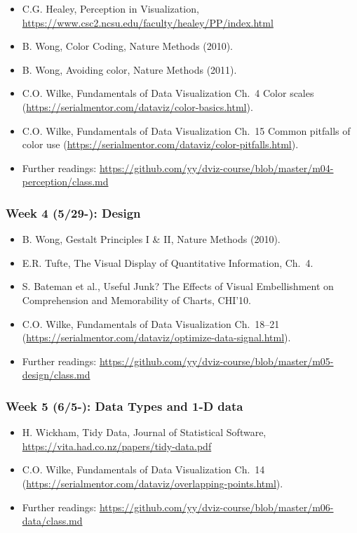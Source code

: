 \begin{itemize}\itemsep0em 
\item C.G. Healey, Perception in Visualization, \url{https://www.csc2.ncsu.edu/faculty/healey/PP/index.html}
\item B. Wong, Color Coding, Nature Methods (2010).
\item B. Wong, Avoiding color, Nature Methods (2011). 
\item C.O. Wilke, Fundamentals of Data Visualization Ch.~4 Color scales (\url{https://serialmentor.com/dataviz/color-basics.html}). 
\item C.O. Wilke, Fundamentals of Data Visualization Ch.~15 Common pitfalls of color use (\url{https://serialmentor.com/dataviz/color-pitfalls.html}).
\item Further readings: \url{https://github.com/yy/dviz-course/blob/master/m04-perception/class.md}
\end{itemize}	
\subsubsection{Week 4 (5/29-): Design }%

\begin{itemize}\itemsep0em 
\item B. Wong, Gestalt Principles I \& II, Nature Methods (2010). 
\item E.R. Tufte, The Visual Display of Quantitative Information, Ch.~4.
\item S. Bateman et al., Useful Junk? The Effects of Visual Embellishment on Comprehension and Memorability of Charts, CHI'10.
\item C.O. Wilke, Fundamentals of Data Visualization Ch.~18--21 (\url{https://serialmentor.com/dataviz/optimize-data-signal.html}). 
\item Further readings: \url{https://github.com/yy/dviz-course/blob/master/m05-design/class.md}
\end{itemize}	
\subsubsection{Week 5 (6/5-): Data Types and 1-D data } %

\begin{itemize}\itemsep0em 
\item H. Wickham, Tidy Data, Journal of Statistical Software, \url{https://vita.had.co.nz/papers/tidy-data.pdf}
\item C.O. Wilke, Fundamentals of Data Visualization Ch.~14 (\url{https://serialmentor.com/dataviz/overlapping-points.html}). 
\item Further readings: \url{https://github.com/yy/dviz-course/blob/master/m06-data/class.md}
\end{itemize}	
